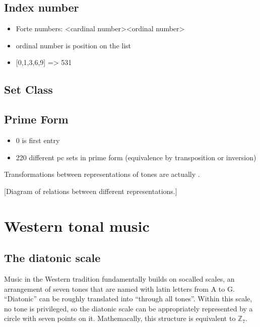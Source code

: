 \documentclass[letterpaper,10pt,english]{sphinxmanual}
\begin{document}
\subsection{Index number}
\label{\detokenize{1_fundamentals:index-number}}\begin{itemize}
\item {} 
Forte numbers: \textless{}cardinal number\textgreater{}\sphinxhyphen{}\textless{}ordinal number\textgreater{}

\item {} 
ordinal number is position on the list

\item {} 
{[}0,1,3,6,9{]} =\textgreater{} 5\sphinxhyphen{}31

\end{itemize}


\subsection{Set Class}
\label{\detokenize{1_fundamentals:set-class}}

\subsection{Prime Form}
\label{\detokenize{1_fundamentals:prime-form}}\begin{itemize}
\item {} 
0 is first entry

\item {} 
220 different pc sets in prime form (equivalence by transposition or inversion)

\end{itemize}

Transformations between representations of tones are actually .

{[}Diagram of relations between different representations.{]}


\section{Western tonal music}
\label{\detokenize{1_fundamentals:western-tonal-music}}

\subsection{The diatonic scale}
\label{\detokenize{1_fundamentals:the-diatonic-scale}}
Music in the Western tradition fundamentally builds on
so\sphinxhyphen{}called  scales, an arrangement of seven tones
that are named with latin letters from A to G. “Diatonic” can
be roughly translated into “through all tones”. Within this scale,
no tone is privileged, so the diatonic scale can be appropriately
represented by a circle with seven points on it. Mathemacally,
this structure is equivalent to \(\mathbb{Z}_7\).
\end{document}
